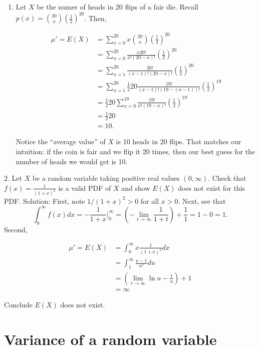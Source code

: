 \documentclass[]{book}
\providecommand{\tightlist}{%
  \setlength{\itemsep}{0pt}\setlength{\parskip}{0pt}}
\begin{document}
\begin{enumerate}
\def\labelenumi{\arabic{enumi}.}
\tightlist
\item
  Let \(X\) be the numer of heads in 20 flips of a fair die. Recall
  \(p(x) = {20 \choose x}\left(\frac12\right)^20\). Then,

  \begin{align*}
  \mu' = E(X) &= \sum_{x = 0}^{20} x {20 \choose x}\left(\frac12\right)^{20}\\
  &=  \sum_{x = 0}^{20} \frac{x20!}{x!(20-x)!}\left(\frac12\right)^{20}\\
  &=  \sum_{x = 1}^{20} \frac{20!}{(x-1)!(20-x)!}\left(\frac12\right)^{20}\\
  &=  \sum_{x = 1}^{20} \frac12 20\frac{19!}{(x-1)!(19-(x-1))!}\left(\frac12\right)^{19}\\
  & = \frac12 20 \sum_{x = 0}^{19} \frac{19!}{x!(19-x)!}\left(\frac12\right)^{19}\\
  & = \frac12 20\\
  & = 10.
  \end{align*}

  Notice the ``average value'' of \(X\) is 10 heads in 20 flips. That
  matches our intuition: if the coin is fair and we flip it 20 times,
  then our best guess for the number of heads we would get is 10.
\end{enumerate}

 2. Let \(X\) be a random variable taking positive real values
\((0,\infty)\). Check that \(f(x) = \frac{1}{(1+x)^2}\) is a valid PDF
of \(X\) and show \(E(X)\) does not exist for this PDF. Solution: First,
note \(1/(1+x)^2 > 0\) for all \(x>0\). Next, see that
\[\int_0^\infty f(x)dx = -\frac{1}{1+x}|_0^\infty = \left(-\lim_{t\rightarrow \infty}\frac{1}{1+t}\right) + \frac{1}{1} = 1-0 = 1.\]
Second,

\begin{align*}
\mu' = E(X) &= \int_{0}^\infty x\frac{1}{(1+x)^2}dx\\
&= \int_1^\infty \frac{u-1}{u^2}du\\
&= \left(\lim_{t\rightarrow \infty} \ln u - \frac{1}{u}\right) + 1 \\
&= \infty
\end{align*}

Conclude \(E(X)\) does not exist.

\section{Variance of a random
variable}\label{variance-of-a-random-variable}
\end{document}
